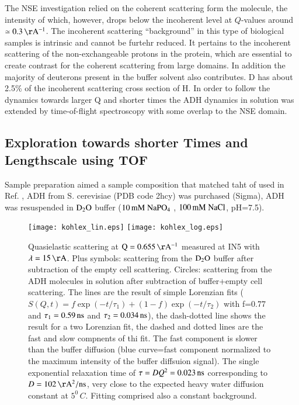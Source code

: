 \documentclass{jpsj-suppl}
\begin{document}
%
The NSE investigation relied on the coherent scattering form the molecule, the intensity
of which, however, drops below the incoherent level at $Q$-values around $\simeq 0.3\,{\rm \AA^{-1}}$.
The incoherent scattering ``background'' in this type of biological samples is 
intrinsic and cannot be furtehr reduced. It pertains to the incoherent scattering of the 
non-exchangeable protons in the protein, which are essential to create contrast for
the coherent scattering from large domains. In addition the majority of deuterons present in
the buffer solvent also contributes. D has about 2.5\% of the incoherent scattering cross section of H.
In order to follow the dynamics towards larger Q and shorter times the 
ADH dynamics in solution was extended by time-of-flight spectroscopy with
some overlap to the NSE domain.  



\subsection{Exploration towards shorter Times and Lengthscale using TOF}
Sample preparation aimed a sample composition that matched taht of used in Ref. \cite{biehl08rb},
ADH from S. cerevisiae (PDB code 2hcy) was purchased (Sigma), 
ADH was resuspended in ${\rm D_2 O}$ buffer
($10\, {\rm mM \; NaPO_4}$ , $100\, {\rm mM \;NaCl}$, pH=7.5).

\begin{figure}[ht]
	\centering
  \texttt{[image: kohlex\_lin.eps]}
  \texttt{[image: kohlex\_log.eps]}
	\caption{Quasielastic scattering at ${\rm Q=0.655\, \AA^{-1}}$ measured at IN5 with
                 $\lambda = {\rm 15 \, \AA}$. Plus symbols: scattering from the ${\rm D_2O}$
                 buffer after subtraction of the empty cell scattering. Circles: scattering
                 from the ADH molecules in solution after subtraction of buffer+empty cell scattering.
                 The lines are the result of simple Lorenzian fits ($S(Q,t)=f \exp(-t/\tau_1) + (1-f)\exp(-t/\tau_2)  $
                 with f=0.77 and $\tau_1=0.59\, {\rm ns}$ and $\tau_2=0.034\,{\rm ns}$),
                 the dash-dotted line shows the result for a two Lorenzian fit, the dashed and dotted lines 
                 are the fast and slow compnents of thi fit. The fast component is slower than
                 the buffer diffusion (blue curve=fast component normalized to the maximum intensity
                 of the buffer diffsuion signal). The single exponential relaxation time of 
                 $\tau=DQ^2 = 0.023\,{\rm ns}$ corresponding to $D=102\,{\rm \AA^2/ns}$, very close to the
                 expected heavy water diffusion constant at $5^0\,C$. 
                 Fitting comprised also a constant background. }
	\label{fig:kohlex}
\end{figure}
\end{document}
